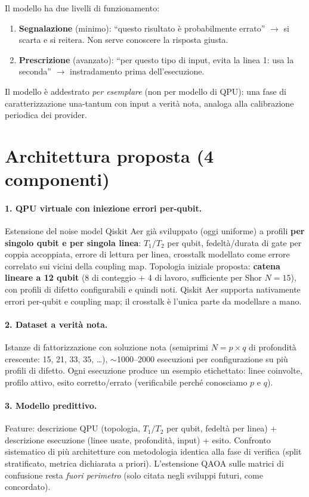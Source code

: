 \documentclass[11pt,a4paper]{article}
\begin{document}
Il modello ha due livelli di funzionamento:
\begin{enumerate}[nosep]
    \item \textbf{Segnalazione} (minimo): ``questo risultato è probabilmente errato'' $\rightarrow$ si scarta e si reitera. Non serve conoscere la risposta giusta.
    \item \textbf{Prescrizione} (avanzato): ``per questo tipo di input, evita la linea 1: usa la seconda'' $\rightarrow$ instradamento prima dell'esecuzione.
\end{enumerate}

Il modello è addestrato \emph{per esemplare} (non per modello di QPU): una fase di caratterizzazione una-tantum con input a verità nota, analoga alla calibrazione periodica dei provider.

\section{Architettura proposta (4 componenti)}

\paragraph{1. QPU virtuale con iniezione errori per-qubit.}
Estensione del noise model Qiskit Aer già sviluppato (oggi uniforme) a profili \textbf{per singolo qubit e per singola linea}: $T_1/T_2$ per qubit, fedeltà/durata di gate per coppia accoppiata, errore di lettura per linea, crosstalk modellato come errore correlato sui vicini della coupling map. Topologia iniziale proposta: \textbf{catena lineare a 12 qubit} (8 di conteggio + 4 di lavoro, sufficiente per Shor $N{=}15$), con profili di difetto configurabili e quindi noti. Qiskit Aer supporta nativamente errori per-qubit e coupling map; il crosstalk è l'unica parte da modellare a mano.

\paragraph{2. Dataset a verità nota.}
Istanze di fattorizzazione con soluzione nota (semiprimi $N = p \times q$ di profondità crescente: 15, 21, 33, 35, \ldots), $\sim$1000--2000 esecuzioni per configurazione su più profili di difetto. Ogni esecuzione produce un esempio etichettato: linee coinvolte, profilo attivo, esito corretto/errato (verificabile perché conosciamo $p$ e $q$).

\paragraph{3. Modello predittivo.}
Feature: descrizione QPU (topologia, $T_1/T_2$ per qubit, fedeltà per linea) + descrizione esecuzione (linee usate, profondità, input) + esito. Confronto sistematico di più architetture con metodologia identica alla fase di verifica (split stratificato, metrica dichiarata a priori). L'estensione QAOA sulle matrici di confusione resta \emph{fuori perimetro} (solo citata negli sviluppi futuri, come concordato).
\end{document}
